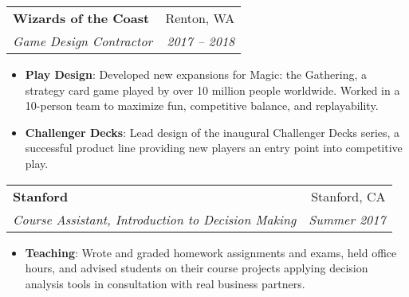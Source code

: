 \documentclass[letterpaper,11pt]{article}
\makeatletter
\newcommand{\resumeItem}[2]{
  \item[$\bullet$]\small{
    \textbf{#1}{: #2 \vspace{-2pt}}
  }
}
\newcommand{\resumePoint}[1]{
	\item[$\bullet$]\small{
		{#1 \vspace{-2pt}}
	}
}
\newcommand{\resumeSubheading}[4]{
	\small{\vspace{-1pt}\item[]
		    \begin{tabular*}{0.97\textwidth}{l@{\extracolsep{\fill}}r}
		      \textbf{#1} & #2 \\
		      \textit{#3} & \textit{ #4} \\
		    \end{tabular*}\vspace{-5pt}}
}
\newcommand{\resumeItemListStart}{\begin{itemize}}
\newcommand{\resumeItemListEnd}{\end{itemize}\vspace{-4pt}}
\makeatother
\begin{document}
    \resumeSubheading
      {Wizards of the Coast}{Renton, WA}
      {Game Design Contractor}{2017 -- 2018}
      \resumeItemListStart
        \resumeItem{Play Design}
			{Developed new expansions for Magic: the Gathering, a strategy card game played by over 10 million people worldwide. Worked in a 10-person team to maximize fun, competitive balance, and replayability.}      
        \resumeItem{Challenger Decks}
            {Lead design of the inaugural Challenger Decks series, a successful product line providing new players an entry point into competitive play.}
      \resumeItemListEnd

    \resumeSubheading
		{Stanford}{Stanford, CA}
		{Course Assistant, Introduction to Decision Making}{Summer 2017}
		\resumeItemListStart
			\resumeItem{Teaching}
				{Wrote and graded homework assignments and exams, held office hours, and advised students on their course projects applying decision analysis tools in consultation with real business partners.}
		\resumeItemListEnd



\end{document}
